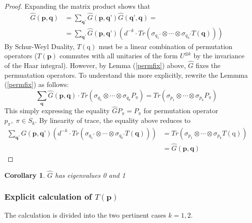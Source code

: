 \documentclass[12pt]{amsart}
\newtheorem{corollary}{Corollary}[theorem]
\theoremstyle{definition}
\theoremstyle{remark}
\numberwithin{equation}{section}
\theoremstyle{remark}
\begin{document}
\begin{proof}
  Expanding the matrix product shows that
  \begin{align}
     \widehat{G}(\textbf{p},\textbf{q})
     & = \sum_{\textbf{q'}} \widehat{G}(\textbf{p},\textbf{q'})\widehat{G}(\textbf{q'},\textbf{q}) = \\
     & = \sum_{\textbf{q'}} \widehat{G}(\textbf{p},\textbf{q'})
          \left( d^{-k} \cdot Tr(\sigma_{q_1'} \otimes \cdots \otimes \sigma_{q_k'}T(\textbf{q})) \right)
  \end{align}
  By Schur-Weyl Duality, $T(\text{q})$ must be a linear combination of permutation operators ($T(\textbf{p})$ commutes with all unitaries of the form $U^{\otimes k}$ by the invariance of the Haar integral). However, by Lemma (\ref{permfix}) above, $\widehat{G}$ fixes the permuatation operators. To understand this more explicitly, rewrite the Lemmma (\ref{permfix}) as follows:
  \begin{equation}
    \sum_{\textbf{q}} \widehat{G}(\textbf{p},\textbf{q})\cdot Tr(\sigma_{q_1} \otimes \cdots \otimes \sigma_{q_k} P_\pi) = Tr(\sigma_{p_1} \otimes \cdots \otimes \sigma_{p_k}P_\pi)
  \end{equation}
  This simply expressing the equality $\widehat{G}P_\pi = P_\pi$ for permutation operator $p_\pi, \; \pi \in S_{k}$. By linearity of trace, the equality above reduces to
  \begin{align}
    \sum_{\textbf{q'}} \widehat{G}(\textbf{p},\textbf{q'})
         \left( d^{-k} \cdot Tr(\sigma_{q_1'} \otimes \cdots \otimes \sigma_{q_k'}T(\textbf{q})) \right)
         & = Tr(\sigma_{p_1} \otimes \cdots \otimes \sigma_{p_k} T(\text{q})) \\
         & = \widehat{G}(\textbf{p},\textbf{q})
  \end{align}
\end{proof}

\begin{corollary}
$\widehat{G}$ has eigenvalues 0 and 1
\end{corollary}

\subsubsection{Explicit calculation of $T(\textbf{p})$}
The calculation is divided into the two pertinent cases $k=1,2$. \newline
\end{document}
